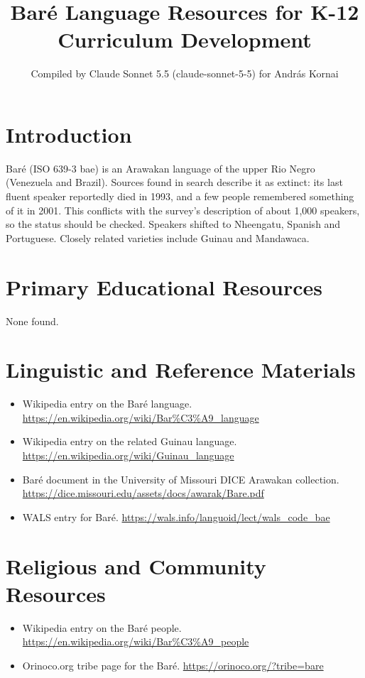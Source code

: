 \documentclass[12pt]{article}
\title{Bar\'e Language Resources for K-12 Curriculum Development}
\author{Compiled by Claude Sonnet 5.5 (claude-sonnet-5-5) for Andr\'as Kornai}
\date{}
\begin{document}
\maketitle

\section{Introduction}
Bar\'e (ISO 639-3 bae) is an Arawakan language of the upper Rio Negro (Venezuela and Brazil). Sources found in search describe it as extinct: its last fluent speaker reportedly died in 1993, and a few people remembered something of it in 2001. This conflicts with the survey's description of about 1,000 speakers, so the status should be checked. Speakers shifted to Nheengatu, Spanish and Portuguese. Closely related varieties include Guinau and Mandawaca.

\section{Primary Educational Resources}
None found.

\section{Linguistic and Reference Materials}
\begin{itemize}
\item Wikipedia entry on the Bar\'e language. \url{https://en.wikipedia.org/wiki/Bar%C3%A9_language}
\item Wikipedia entry on the related Guinau language. \url{https://en.wikipedia.org/wiki/Guinau_language}
\item Bar\'e document in the University of Missouri DICE Arawakan collection. \url{https://dice.missouri.edu/assets/docs/awarak/Bare.pdf}
\item WALS entry for Bar\'e. \url{https://wals.info/languoid/lect/wals_code_bae}
\end{itemize}

\section{Religious and Community Resources}
\begin{itemize}
\item Wikipedia entry on the Bar\'e people. \url{https://en.wikipedia.org/wiki/Bar%C3%A9_people}
\item Orinoco.org tribe page for the Bar\'e. \url{https://orinoco.org/?tribe=bare}
\end{itemize}
\end{document}
